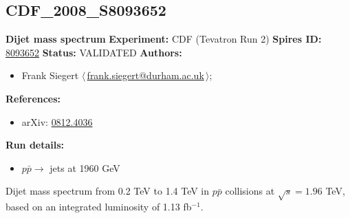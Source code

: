 \subsection[CDF\_2008\_S8093652]{CDF\_2008\_S8093652\,\cite{Aaltonen:2008dn}}
\textbf{Dijet mass spectrum}\newline
\textbf{Experiment:} CDF (Tevatron Run 2) \newline
\textbf{Spires ID:} \href{http://www.slac.stanford.edu/spires/find/hep/www?rawcmd=key+8093652}{8093652}\newline
\textbf{Status:} VALIDATED\newline
\textbf{Authors:}
\begin{itemize}
  \item Frank Siegert $\langle\,$\href{mailto:frank.siegert@durham.ac.uk}{frank.siegert@durham.ac.uk}$\,\rangle$;
\end{itemize}
\textbf{References:}
\begin{itemize}
  \item arXiv: \href{http://arxiv.org/abs/0812.4036}{0812.4036}
\end{itemize}
\textbf{Run details:}
\begin{itemize}

  \item $p \bar{p} \to$ jets at 1960 GeV\end{itemize}

\noindent Dijet mass spectrum  from 0.2 TeV to 1.4 TeV in $p \bar{p}$ collisions at $\sqrt{s} = 1.96$ TeV, based on an integrated luminosity of 1.13 fb$^{-1}$.

\clearpage


\clearpage

